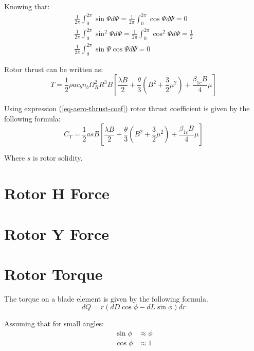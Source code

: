 Knowing that: \cite{GessowMyers1985}
\begin{gather}
  \frac{1}{2\pi} \int_{0}^{2\pi} \sin \Psi d\Psi =
  \frac{1}{2\pi} \int_{0}^{2\pi} \cos \Psi d\Psi = 0 \\
  \frac{1}{2\pi} \int_{0}^{2\pi} \sin^2 \Psi d\Psi =
  \frac{1}{2\pi} \int_{0}^{2\pi} \cos^2 \Psi d\Psi = \frac{1}{2} \\
  \frac{1}{2\pi} \int_{0}^{2\pi} \sin \Psi \cos \Psi d\Psi = 0
\end{gather}

Rotor thrust can be written as:
\begin{equation}
  T = \frac{1}{2} \rho a c_b n_b \Omega_R^2 R^3 B
  \left[
    \frac{\lambda B}{2} 
    +
    \frac{\theta}{3} \left( B^2 + \frac{3}{2} \mu^2 \right)
    +
    \frac{\beta_{1c} B}{4} \mu
  \right]
\end{equation}

Using expression (\ref{eq-aero-thrust-coef}) rotor thrust coefficient is given by the following formula:
\begin{equation}
  C_T = \frac{1}{2} a s B
  \left[
    \frac{\lambda B}{2}
    +
    \frac{\theta}{3} \left( B^2 + \frac{3}{2} \mu^2 \right)
    +
    \frac{\beta_{1c} B}{4} \mu
  \right]
\end{equation}

Where $s$ is rotor solidity.

\section{Rotor H Force}


\section{Rotor Y Force}


\section{Rotor Torque}

The torque on a blade element is given by the following formula. \cite{GessowMyers1985, Bramwell2001}
\begin{equation}
  \label{eq-aero-blade-section-torque}
  dQ = r \left( dD \cos \phi - dL \sin \phi \right) dr
\end{equation}

Assuming that for small angles:
\begin{align}
  \sin \phi &\approx \phi \\
  \cos \phi &\approx 1
\end{align}

